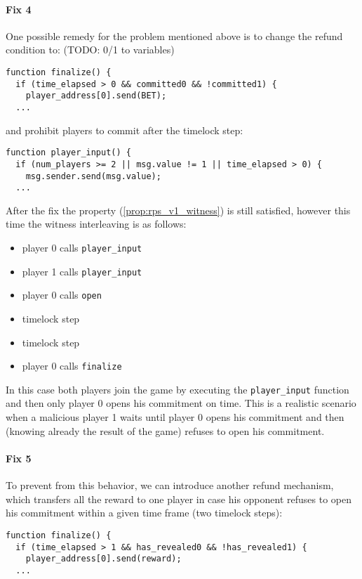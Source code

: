 \paragraph{Fix 4}

One possible remedy for the problem mentioned above is to change the refund condition to: (TODO: 0/1 to variables)
\begin{lstlisting}
function finalize() {
  if (time_elapsed > 0 && committed0 && !committed1) {
    player_address[0].send(BET);
  ...
\end{lstlisting}
and prohibit players to commit after the timelock step:
\begin{lstlisting}
function player_input() {
  if (num_players >= 2 || msg.value != 1 || time_elapsed > 0) {
    msg.sender.send(msg.value);
  ...
\end{lstlisting}

After the fix the property (\ref{prop:rps_v1_witness}) is still satisfied, however this time the witness interleaving
is as follows:
\begin{itemize}
\item player 0 calls \lstinline{player_input}
\item player 1 calls \lstinline{player_input}
\item player 0 calls \lstinline{open}
\item timelock step
\item timelock step
\item player 0 calls \lstinline{finalize}
\end{itemize}

In this case both players join the game by executing the \lstinline{player_input} function and then only
player 0 opens his commitment on time.
This is a realistic scenario when a malicious player 1 waits until player 0 opens his commitment and then 
(knowing already the result of the game) refuses to open his commitment.

\paragraph{Fix 5}

To prevent from this behavior, we can introduce another refund mechanism, which transfers all the reward
to one player in case his opponent refuses to open his commitment within a given time frame (two timelock steps):
\begin{lstlisting}
function finalize() {
  if (time_elapsed > 1 && has_revealed0 && !has_revealed1) {
    player_address[0].send(reward);
  ...
\end{lstlisting}

